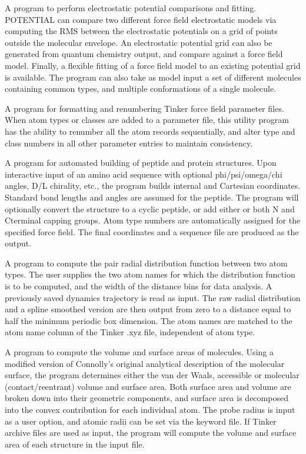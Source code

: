 \documentclass[letterpaper,11pt,english]{sphinxmanual}
\begin{document}

A program to perform electrostatic potential comparisons and fitting. POTENTIAL can compare two different force field electrostatic models via computing the RMS between the electrostatic potentials on a grid of points outside the molecular envelope. An electrostatic potential grid can also be generated from quantum chemistry output, and compare against a force field model. Finally, a flexible fitting of a force field model to an existing potential grid is available. The program can also take as model input a set of different molecules containing common types, and multiple conformations of a single molecule.


A program for formatting and renumbering Tinker force field parameter files. When atom types or classes are added to a parameter file, this utility program has the ability to renumber all the atom records sequentially, and alter type and class numbers in all other parameter entries to maintain consistency.


A program for automated building of peptide and protein structures. Upon interactive input of an amino acid sequence with optional phi/psi/omega/chi angles, D/L chirality, etc., the program builds internal and Cartesian coordinates. Standard bond lengths and angles are assumed for the peptide. The program will optionally convert the structure to a cyclic peptide, or add either or both N\sphinxhyphen{} and C\sphinxhyphen{}terminal capping groups. Atom type numbers are automatically assigned for the specified force field. The final coordinates and a sequence file are produced as the output.


A program to compute the pair radial distribution function between two atom types. The user supplies the two atom names for which the distribution function is to be computed, and the width of the distance bins for data analysis. A previously saved dynamics trajectory is read as input. The raw radial distribution and a spline smoothed version are then output from zero to a distance equal to half the minimum periodic box dimension. The atom names are matched to the atom name column of the Tinker .xyz file, independent of atom type.


A program to compute the volume and surface areas of molecules. Using a modified version of Connolly’s original analytical description of the molecular surface, the program determines either the van der Waals, accessible or molecular (contact/reentrant) volume and surface area. Both surface area and volume are broken down into their geometric components, and surface area is decomposed into the convex contribution for each individual atom. The probe radius is input as a user option, and atomic radii can be set via the keyword file. If Tinker archive files are used as input, the program will compute the volume and surface area of each structure in the input file.
\end{document}
